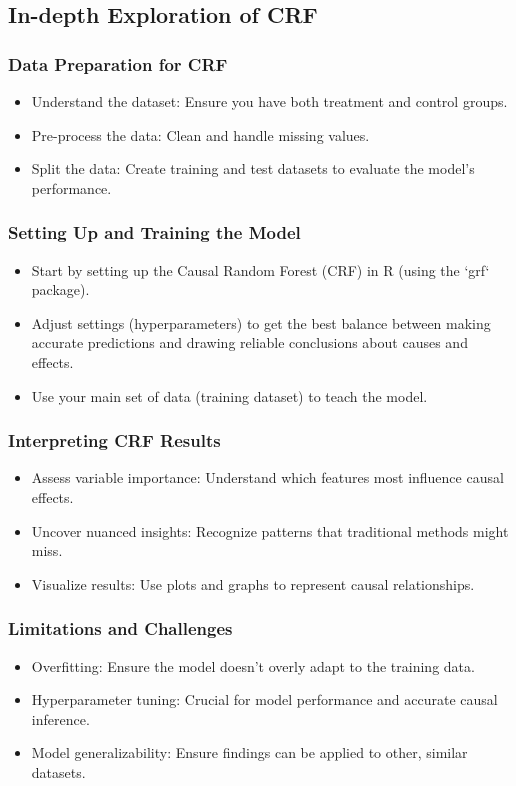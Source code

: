 \documentclass{beamer}
\begin{document}
\subsection{In-depth Exploration of CRF}

\begin{frame}
\frametitle{Data Preparation for CRF}
\begin{itemize}
    \item Understand the dataset: Ensure you have both treatment and control groups.
    \item Pre-process the data: Clean and handle missing values.
    \item Split the data: Create training and test datasets to evaluate the model's performance.
\end{itemize}
\end{frame}

\begin{frame}
\frametitle{Setting Up and Training the Model}
\begin{itemize}
    \item Start by setting up the Causal Random Forest (CRF) in R (using the `grf` package).
    \item Adjust settings (hyperparameters) to get the best balance between making accurate predictions and drawing reliable conclusions about causes and effects.
    \item Use your main set of data (training dataset) to teach the model.
\end{itemize}
\end{frame}

\begin{frame}
\frametitle{Interpreting CRF Results}
\begin{itemize}
    \item Assess variable importance: Understand which features most influence causal effects.
    \item Uncover nuanced insights: Recognize patterns that traditional methods might miss.
    \item Visualize results: Use plots and graphs to represent causal relationships.
\end{itemize}
\end{frame}

\begin{frame}
\frametitle{Limitations and Challenges}
\begin{itemize}
    \item Overfitting: Ensure the model doesn't overly adapt to the training data.
    \item Hyperparameter tuning: Crucial for model performance and accurate causal inference.
    \item Model generalizability: Ensure findings can be applied to other, similar datasets.
\end{itemize}
\end{frame}
\end{document}
